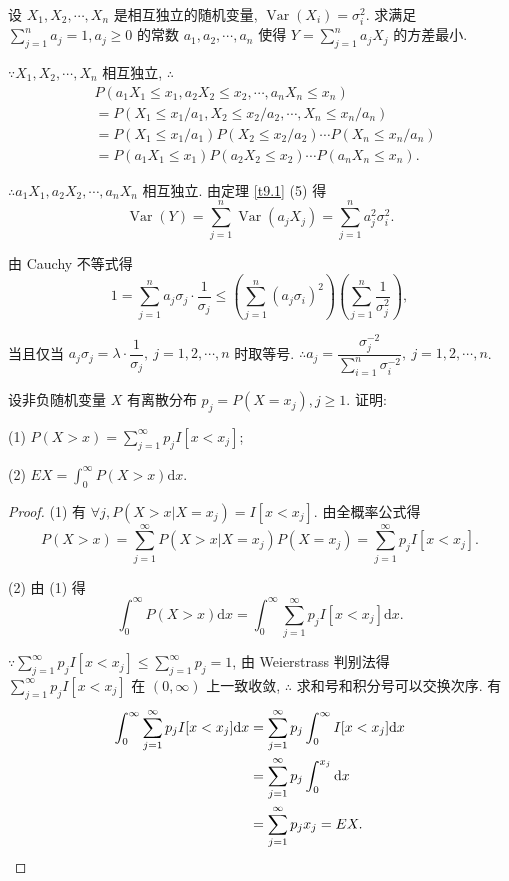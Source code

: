 \documentclass[color=black,device=normal,lang=cn]{elegantnote}
\numberwithin{equation}{section}
\theoremstyle{plain}
\numberwithin{exercise}{exsection}
\begin{document}
\begin{exercise}%
    设 $X_1,X_2,\cdots,X_n$ 是相互独立的随机变量, $\operatorname{Var}(X_i)=\sigma_i^2$. 求满足 $\sum\limits_{j=1}^na_j=1,a_j\geq0$ 的常数 $a_1,a_2,\cdots,a_n$ 使得 $Y=\sum\limits_{j=1}^na_jX_j$ 的方差最小.
\end{exercise}
\begin{solution}
    $\because X_1,X_2,\cdots,X_n$ 相互独立, $\therefore$
    \begin{align*}
        & P(a_1X_1\leq x_1,a_2X_2\leq x_2,\cdots,a_nX_n\leq x_n) \\
        & =P(X_1\leq x_1/a_1,X_2\leq x_2/a_2,\cdots,X_n\leq x_n/a_n) \\
        & =P(X_1\leq x_1/a_1)P(X_2\leq x_2/a_2)\cdots P(X_n\leq x_n/a_n) \\
        & =P(a_1X_1\leq x_1)P(a_2X_2\leq x_2)\cdots P(a_nX_n\leq x_n).
    \end{align*}

    $\therefore a_1X_1,a_2X_2,\cdots,a_nX_n$ 相互独立. 由定理 \ref{t9.1} (5) 得
    \[\operatorname{Var}(Y)=\sum\limits_{j=1}^n\operatorname{Var}(a_jX_j)=\sum\limits_{j=1}^na_j^2\sigma_i^2.\]

    由 Cauchy 不等式得
    \[1=\sum\limits_{j=1}^na_j\sigma_j\cdot\dfrac{1}{\sigma_j}\leq\left(\sum\limits_{j=1}^n(a_j\sigma_i)^2\right)\left(\sum\limits_{j=1}^n\dfrac{1}{\sigma_j^2}\right),\]

    当且仅当 $a_j\sigma_j=\lambda\cdot\dfrac{1}{\sigma_j},\ j=1,2,\cdots,n$ 时取等号. $\therefore a_j=\dfrac{\sigma_j^{-2}}{\sum\limits_{i=1}^n\sigma_i^{-2}},\ j=1,2,\cdots,n$.
\end{solution}
\addtocounter{exercise}{2}
\begin{exercise}%
    设非负随机变量 $X$ 有离散分布 $p_j=P(X=x_j),j\geq 1$. 证明:
    
    (1) $P(X>x)=\sum\limits_{j=1}^\infty p_jI[x<x_j]$;

    (2) $EX=\int_0^\infty P(X>x)\mathrm{d}x$.
\end{exercise}
\begin{proof}
    (1) 有 $\forall j,P(X>x|X=x_j)=I[x<x_j]$. 由全概率公式得
    \[P(X>x)=\sum\limits_{j=1}^\infty P(X>x|X=x_j)P(X=x_j)=\sum\limits_{j=1}^\infty p_jI[x<x_j].\]

    (2) 由 (1) 得
    \[\int_0^\infty P(X>x)\mathrm{d}x=\int_0^\infty\sum\limits_{j=1}^\infty p_jI[x<x_j]\mathrm{d}x.\]

    $\because\sum\limits_{j=1}^\infty p_jI[x<x_j]\leq\sum\limits_{j=1}^\infty p_j=1$, 由 Weierstrass 判别法得 $\sum\limits_{j=1}^\infty p_jI[x<x_j]$ 在 $(0,\infty)$ 上一致收敛, $\therefore$ 求和号和积分号可以交换次序. 有
    \begin{align*}
        \int_0^\infty\sum\limits_{j=1}^\infty p_jI[x<x_j]\mathrm{d}x & =\sum\limits_{j=1}^\infty p_j\int_0^\infty I[x<x_j]\mathrm{d}x \\
        & =\sum\limits_{j=1}^\infty p_j\int_0^{x_j}\mathrm{d}x \\
        & =\sum\limits_{j=1}^\infty p_jx_j=EX.\qedhere
    \end{align*}
\end{proof}
\end{document}
